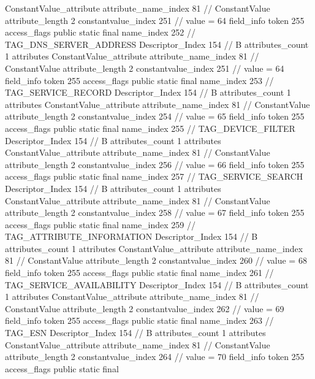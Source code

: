 {{{{{{				ConstantValue_attribute {
					attribute_name_index	81		// ConstantValue
					attribute_length	2
					constantvalue_index	251		// value = 64
				}
				}
			}
			field_info {
				token	255
				access_flags	public static final
				name_index	252		// TAG_DNS_SERVER_ADDRESS
				Descriptor_Index	154		// B
				attributes_count	1
				attributes {
				ConstantValue_attribute {
					attribute_name_index	81		// ConstantValue
					attribute_length	2
					constantvalue_index	251		// value = 64
				}
				}
			}
			field_info {
				token	255
				access_flags	public static final
				name_index	253		// TAG_SERVICE_RECORD
				Descriptor_Index	154		// B
				attributes_count	1
				attributes {
				ConstantValue_attribute {
					attribute_name_index	81		// ConstantValue
					attribute_length	2
					constantvalue_index	254		// value = 65
				}
				}
			}
			field_info {
				token	255
				access_flags	public static final
				name_index	255		// TAG_DEVICE_FILTER
				Descriptor_Index	154		// B
				attributes_count	1
				attributes {
				ConstantValue_attribute {
					attribute_name_index	81		// ConstantValue
					attribute_length	2
					constantvalue_index	256		// value = 66
				}
				}
			}
			field_info {
				token	255
				access_flags	public static final
				name_index	257		// TAG_SERVICE_SEARCH
				Descriptor_Index	154		// B
				attributes_count	1
				attributes {
				ConstantValue_attribute {
					attribute_name_index	81		// ConstantValue
					attribute_length	2
					constantvalue_index	258		// value = 67
				}
				}
			}
			field_info {
				token	255
				access_flags	public static final
				name_index	259		// TAG_ATTRIBUTE_INFORMATION
				Descriptor_Index	154		// B
				attributes_count	1
				attributes {
				ConstantValue_attribute {
					attribute_name_index	81		// ConstantValue
					attribute_length	2
					constantvalue_index	260		// value = 68
				}
				}
			}
			field_info {
				token	255
				access_flags	public static final
				name_index	261		// TAG_SERVICE_AVAILABILITY
				Descriptor_Index	154		// B
				attributes_count	1
				attributes {
				ConstantValue_attribute {
					attribute_name_index	81		// ConstantValue
					attribute_length	2
					constantvalue_index	262		// value = 69
				}
				}
			}
			field_info {
				token	255
				access_flags	public static final
				name_index	263		// TAG_ESN
				Descriptor_Index	154		// B
				attributes_count	1
				attributes {
				ConstantValue_attribute {
					attribute_name_index	81		// ConstantValue
					attribute_length	2
					constantvalue_index	264		// value = 70
				}
				}
			}
			field_info {
				token	255
				access_flags	public static final
}}}}}
